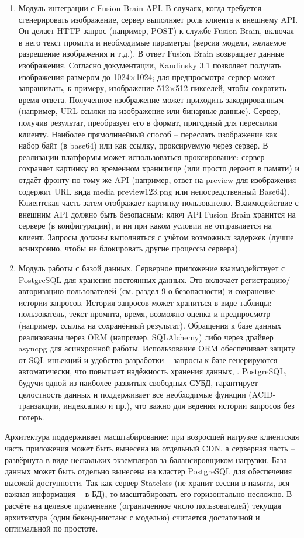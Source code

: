 \begin{enumerate}[label=\arabic*]
    \item Модуль интеграции с Fusion Brain API. В случаях, когда требуется сгенерировать изображение, сервер выполняет роль клиента к внешнему API. Он делает HTTP-запрос (например, POST) к службе Fusion Brain, включая в него текст промпта и необходимые параметры (версия модели, желаемое разрешение изображения и т.д.). В ответ Fusion Brain возвращает данные изображения. Согласно документации, Kandinsky 3.1 позволяет получать изображения размером до 1024×1024; для предпросмотра сервер может запрашивать, к примеру, изображение 512×512 пикселей, чтобы сократить время ответа\cite{fusionbrain:docs}. Полученное изображение может приходить закодированным (например, URL ссылки на изображение или бинарные данные). Сервер, получив результат, преобразует его в формат, пригодный для пересылки клиенту. Наиболее прямолинейный способ – переслать изображение как набор байт (в base64) или как ссылку, проксируемую через сервер. В реализации платформы может использоваться проксирование: сервер сохраняет картинку во временном хранилище (или просто держит в памяти) и отдаёт фронту по тому же API (например, ответ на preview для изображения содержит URL вида media preview123.png или непосредственный Base64). Клиентская часть затем отображает картинку пользователю. Взаимодействие с внешним API должно быть безопасным: ключ API Fusion Brain хранится на сервере (в конфигурации), и ни при каком условии не отправляется на клиент. Запросы должны выполняться с учётом возможных задержек (лучше асинхронно, чтобы не блокировать другие процессы сервера).
    \item Модуль работы с базой данных. Серверное приложение взаимодействует с PostgreSQL для хранения постоянных данных. Это включает регистрацию/авторизацию пользователей (см. раздел 9 о безопасности) и сохранение истории запросов. История запросов может храниться в виде таблицы: пользователь, текст промпта, время, возможно оценка и предпросмотр (например, ссылка на сохранённый результат). Обращения к базе данных реализованы через ORM (например, SQLAlchemy) либо через драйвер asyncpg для асинхронной работы. Использование ORM обеспечивает защиту от SQL-инъекций и удобство разработки – запросы к базе генерируются автоматически, что повышает надёжность хранения данных\cite{postgresql:skillfactory}, \cite{postgresql:wiki}. PostgreSQL, будучи одной из наиболее развитых свободных СУБД, гарантирует целостность данных и поддерживает все необходимые функции (ACID-транзакции, индексацию и пр.), что важно для ведения истории запросов без потерь. 
\end{enumerate}
Архитектура поддерживает масштабирование: при возросшей нагрузке клиентская часть приложения может быть вынесена на отдельный CDN, а серверная часть – развёрнута в виде нескольких экземпляров за балансировщиком нагрузки. База данных может быть отдельно вынесена на кластер PostgreSQL для обеспечения высокой доступности. Так как сервер Stateless (не хранит сессии в памяти, вся важная информация – в БД), то масштабировать его горизонтально несложно. В расчёте на целевое применение (ограниченное число пользователей) текущая архитектура (один бекенд-инстанс с моделью) считается достаточной и оптимальной по простоте.

